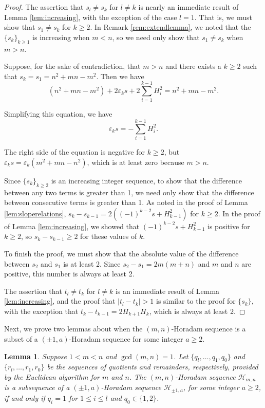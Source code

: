 \documentclass{amsart}
\newtheorem{lemma}{Lemma}
\begin{document}
\begin{proof}
The assertion that $s_l \neq s_k$ for $l \neq k$ is nearly an immediate result of Lemma \ref{lem:increasing}, with the exception of the case $l=1$. That is, we must show that $s_1 \neq s_k$ for $k\ge 2$. In Remark \ref{rem:extendlemma}, we noted that the $\{s_k\}_{k\ge1}$ is increasing when $m<n$, so we need only show that $s_1 \neq s_k$ when $m>n$. 

Suppose, for the sake of contradiction, that $m>n$ and there exists a $k\ge 2$ such that $s_k = s_1 = n^2 + mn - m^2$. Then we have  $$(n^2+mn -m^2) + 2\varepsilon_k s  + 2\sum_{i=1}^{k-1} H_i^2 = n^2+mn -m^2.$$ 

Simplifying this equation, we have $$  \varepsilon_k s   =  -  \sum_{i=1}^{k-1} H_i^2.$$ 

The right side of the equation is negative for $k\ge 2$, but $\varepsilon_k s = \varepsilon_k(m^2 + mn - n^2)$, which is at least zero because $m>n$. 

Since $\{s_k\}_{k\ge2}$ is an increasing integer sequence, to show that the difference between any two terms is greater than 1, we need only show that the difference between consecutive terms is greater than 1.  
As noted in the proof of Lemma \ref{lem:sloperelations}, $s_k - s_{k-1} = 2((-1)^{k-2} s + H_{k-1}^2)$ for $k\ge 2$. In the proof of Lemma \ref{lem:increasing}, we showed that $(-1)^{k-2} s + H_{k-1}^2$ is positive for $k\ge 2$, so $s_k - s_{k-1} \ge 2$ for these values of $k$.

To finish the proof, we must show that the absolute value of the difference between $s_2$ and $s_1$ is at least 2. Since $s_2 - s_1 = 2m(m+n) $ and $m$ and $n$ are positive, this number is always at least 2.

The assertion that $t_l \neq t_k$ for $l \neq k$ is an immediate result of Lemma \ref{lem:increasing}, and the proof that $|t_l-t_k| >1$ is similar to the proof for $\{s_k\}$, with the exception that $t_k - t_{k-1} = 2H_{k+1}H_k$, which is always at least 2. 
\end{proof}

Next, we prove two lemmas about when the $(m,n)$-Horadam sequence is a subset of a $(\pm 1,a)$-Horadam sequence for some integer $a \ge 2$.

\begin{lemma}\label{lem:subseq}
Suppose $1<  m < n$ and $\gcd(m,n) = 1$. Let $\{q_l, \ldots, q_1, q_0\}$ and $\{r_l, \ldots, r_1, r_0\}$ be the sequences of quotients and remainders, respectively, provided by the Euclidean algorithm for $m$ and $n$.  The $(m,n)$-Horadam sequence $\mathcal H_{m,n}$ is a subsequence of a $(\pm 1,a)$-Horadam sequence $\mathcal H_{\pm 1, a}$, for some integer $a\ge 2$, if and only if $q_i = 1$ for $1 \le i \le l$ and $q_0 \in\{1, 2\}$.
\end{lemma}
\end{document}
